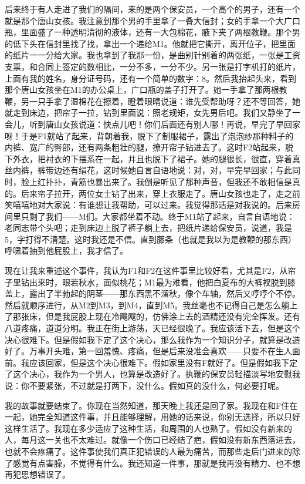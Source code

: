 后来终于有人走进了我们的隔间，来的是两个保安员，一个高个的男子，还有一个就是那个唐山女孩。我注意到那个男的手里拿了一叠大信封；女的手拿一个大广口瓶，里面盛了一种透明清彻的液体，还有一大包棉花，腋下夹了两根教鞭。那个男的低下头在信封里找了找，拿出一个递给M1。他就把它撕开，离开位子，把里面的纸片一一分给大家。我也拿到了我那一份，是曲别针别着的两张纸，一张是工资支票，和合同上签定的数相比，一分不多，一分不少。另一张是打字机打的纸片，上面有我的姓名，身分证号码，还有一个简单的数字：8。然后我抬起头来，看到那个唐山女孩坐在M1的办公桌上，广口瓶的盖子打开了。她一手拿了那两根教鞭，另一只手拿了湿棉花在擦着，瞪着眼睛说道：谁先受帮助呀？还不等回答，她就走到床边，把帘子一拉，钻到里面说：照老规矩，女先男后吧。我们又静坐了一会儿，听到唐山女孩说道：快点儿吧！你们后面还有别人哪！再说，早完了早回家呀！于是F1就站了起来，背朝着我，脱下了制服裙子，露出了泡泡纱那种料子的内裤、宽广的臀部，还有两条粗壮的腿，撩开帘子钻进去了。这时F2站起来，脱下外衣，把衬衣的下摆系在一起，并且也脱下了裙子。她的腿很长，很直，穿着真丝内裤，裤带边还有绢花，这时候她自言自语地说：对，对，早完早回家；与此同时，脸上红扑扑，青筋也暴出来了。我倒是听见了那种声音，但我还不敢相信是真的。后来帘子拉开，两位女士钻了出来，穿上衣服走了。唐山女孩也走了，走之前笑嘻嘻地对大家说：有谁想让我帮助，可以过来。我觉得那话是对我说的。后来房间里只剩了我们——M们。大家都坐着不动。终于M1站了起来，自言自语地说：老同志带个头吧；走到床边上脱了裤子躺上去，把纸片递给保安员，说道，我是5，字打得不清楚。这时我还是不信。直到藤条（也就是我以为是教鞭的那东西）呼啸着抽到他屁股上，我才信了。 

现在让我来重述这个事件，我认为F1和F2在这件事里比较好看，尤其是F2，从帘子里钻出来时，眼若秋水，面似桃花；M1最为难看，他把白夏布的大裤衩脱到膝盖上，露出了半勃起的阴茎——那东西黑不溜秋，像个车轴，然后又哼哼个不停。然后就顺序进行，从M2到M3，到M4，直到M5。我丝毫也不记得自己是怎么躺上了那张床，但是我屁股上现在冷飕飕的，仿佛涂上去的酒精还没有完全挥发。还有八道疼痛，道道分明。我正在街上游荡，天已经很晚了。我应该活下去，但是这个决心很难下。但是假如我下定了这个决心，那么我作为一个知识分子，就算是改造好了。万事开头难，第一回羞愧、疼痛，但是后来没准会喜欢——只要不在生人面前。我应该回家，但是这个决心很难下。假如家里没有F就好了。但是假如我下定了这个决心，我作为一个男人，也算是改造好了。执鞭的保安员轻描淡写地安慰我说：你不要紧张，不过就是打两下，没什么。假如真的没什么，何必要打呢。 

我的故事就要结束了。你现在当然知道，那天晚上我还是回了家。我现在和F住在一起，她完全知道这件事，并且能够理解，用她的话来说，你别无选择，所以只好这样生活了。我现在多少适应了这种生活，和周围的人也熟了。假如没有新来的人，每月这一关也不太难过。就像一个伤口已经结了疤，假如没有新东西落进去，也就不会疼痛了。这件事使我们真正犯错误的人最为痛苦，而那些走后门进来的除了感觉有点害臊，不觉得有什么。我还知道一件事，那就是我再没有精力、也不想再犯思想错误了。 

